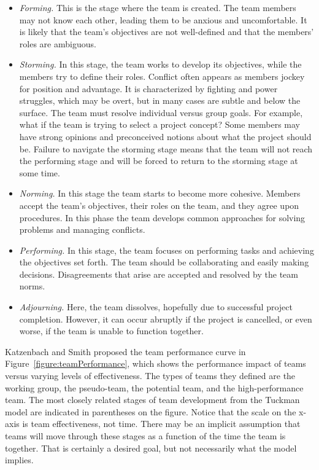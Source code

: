 \begin{itemize}
\item
  \emph{Forming.} This is the stage where the team is created. The team
  members may not know each other, leading them to be anxious and
  uncomfortable. It is likely that the team's objectives are not
  well-defined and that the members' roles are ambiguous.
\item
  \emph{Storming.} In this stage, the team works to develop its
  objectives, while the members try to define their roles. Conflict
  often appears as members jockey for position and advantage. It is
  characterized by fighting and power struggles, which may be overt, but
  in many cases are subtle and below the surface. The team must resolve
  individual versus group goals. For example, what if the team is trying
  to select a project concept? Some members may have strong opinions and
  preconceived notions about what the project should be. Failure to
  navigate the storming stage means that the team will not reach the
  performing stage and will be forced to return to the storming stage at
  some time.
\item
  \emph{Norming.} In this stage the team starts to become more cohesive.
  Members accept the team's objectives, their roles on the team, and
  they agree upon procedures. In this phase the team develops common
  approaches for solving problems and managing conflicts.
\item
  \emph{Performing.} In this stage, the team focuses on performing tasks
  and achieving the objectives set forth. The team should be
  collaborating and easily making decisions. Disagreements that arise
  are accepted and resolved by the team norms.
\item
  \emph{Adjourning.} Here, the team dissolves, hopefully due to
  successful project completion. However, it can occur abruptly if the
  project is cancelled, or even worse, if the team is unable to function
  together.
\end{itemize}

Katzenbach and Smith proposed the team performance curve in 
Figure~\ref{figure:teamPerformance},
which shows the performance impact of teams versus varying levels of
effectiveness. The types of teams they defined are the working group,
the pseudo-team, the potential team, and the high-performance team. The
most closely related stages of team development from the Tuckman model
are indicated in parentheses on the figure. Notice that the scale on the
x-axis is team effectiveness, not time. There may be an implicit
assumption that teams will move through these stages as a function of
the time the team is together. That is certainly a desired goal, but not
necessarily what the model implies.

